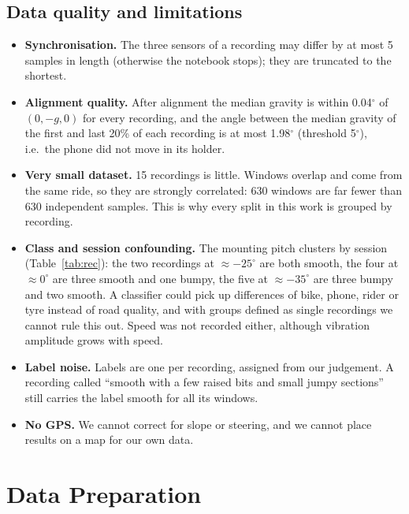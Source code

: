 \documentclass[10pt,a4paper]{article}
\begin{document}
\subsection{Data quality and limitations}
\label{sec:quality}

\begin{itemize}
  \item \textbf{Synchronisation.} The three sensors of a recording may differ by at most 5 samples in length (otherwise the notebook stops); they are truncated to the shortest.
  \item \textbf{Alignment quality.} After alignment the median gravity is within 0.04$^\circ$ of $(0,-g,0)$ for every recording, and the angle between the median gravity of the first and last 20\% of each recording is at most 1.98$^\circ$ (threshold 5$^\circ$), i.e.\ the phone did not move in its holder.
  \item \textbf{Very small dataset.} 15 recordings is little. Windows overlap and come from the same ride, so they are strongly correlated: 630 windows are far fewer than 630 independent samples. This is why every split in this work is grouped by recording.
  \item \textbf{Class and session confounding.} The mounting pitch clusters by session (Table~\ref{tab:rec}): the two recordings at $\approx-25^\circ$ are both smooth, the four at $\approx 0^\circ$ are three smooth and one bumpy, the five at $\approx-35^\circ$ are three bumpy and two smooth. A classifier could pick up differences of bike, phone, rider or tyre instead of road quality, and with groups defined as single recordings we cannot rule this out. Speed was not recorded either, although vibration amplitude grows with speed.
  \item \textbf{Label noise.} Labels are one per recording, assigned from our judgement. A recording called ``smooth with a few raised bits and small jumpy sections'' still carries the label smooth for all its windows.
  \item \textbf{No GPS.} We cannot correct for slope or steering, and we cannot place results on a map for our own data.
\end{itemize}

\section{Data Preparation}
\end{document}
